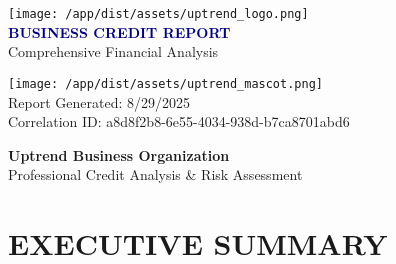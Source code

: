 \documentclass[11pt,a4paper]{article}
\begin{document}
\begin{titlepage}
    \centering
    \vspace*{2cm}
    
    \texttt{[image: /app/dist/assets/uptrend\_logo.png]}\\[1cm]
    
    {\huge\textbf{\textcolor{darkblue}{BUSINESS CREDIT REPORT}}}\\[0.5cm]
    
    {\Large\textcolor{uptrendblue}{Comprehensive Financial Analysis}}\\[2cm]
    
    
    \vspace{2cm}
    
    \texttt{[image: /app/dist/assets/uptrend\_mascot.png]}\\[1cm]
    
    {\large\textcolor{uptrendgray}{Report Generated: 8/29/2025}}\\[0.3cm]
    {\large\textcolor{uptrendgray}{Correlation ID: a8d8f2b8-6e55-4034-938d-b7ca8701abd6}}
    
    \vfill
    
    {\textcolor{uptrendblue}{\textbf{Uptrend Business Organization}}}\\
    {\small Professional Credit Analysis \& Risk Assessment}
    
\end{titlepage}

\newpage

\section*{EXECUTIVE SUMMARY}
\end{document}

